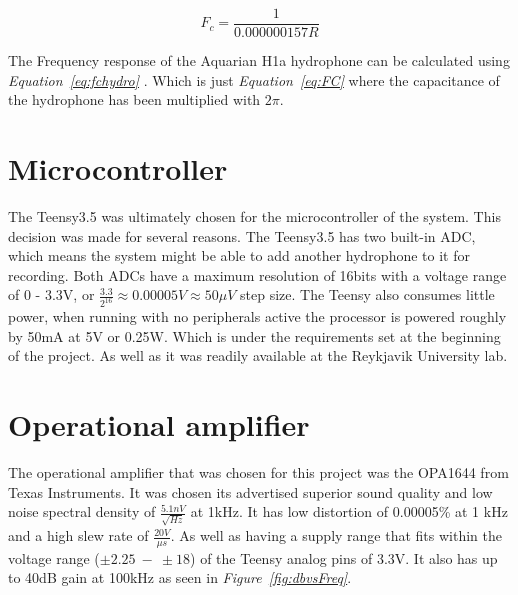 \clearpage

\begin{equation}
    F_c = \frac{1}{ 0.000000157 R}  
\label{eq:fchydro}
\end{equation}

The Frequency response of the Aquarian H1a hydrophone can be calculated using \textit{Equation~\ref{eq:fchydro}} \cite{noauthor_aquarian_nodate}. 
Which is just \textit{Equation~\ref{eq:FC}} where the capacitance of the hydrophone has been multiplied with $2\pi$.



\section{Microcontroller}
The Teensy3.5 was ultimately chosen for the microcontroller of the system.
This decision was made for several reasons.
The Teensy3.5 has two built-in ADC, which means the system might be able to add another hydrophone to it for recording.
Both ADCs have a maximum resolution of 16bits with a voltage range of 0 - 3.3V, or $\frac{3.3}{2^{16}} \approx 0.00005V \approx 50\mu V$ step size.
The Teensy also consumes little power, when running with no peripherals active the processor is powered roughly by 50mA at 5V or 0.25W.
Which is under the requirements set at the beginning of the project.
As well as it was readily available at the Reykjavik University lab.

\section{Operational amplifier}

The operational amplifier that was chosen for this project was the OPA1644 from Texas Instruments.
It was chosen its advertised superior sound quality and low noise spectral density of $\frac{5.1nV}{\sqrt{Hz}}$ at 1kHz.
It has low distortion of 0.00005\% at 1 kHz and a high slew rate of $\frac{20V}{\mu s}$.
As well as having a supply range that fits within the voltage range ($\pm2.25~-~\pm18$) of the Teensy analog pins of 3.3V\cite{noauthor_opa164x_nodate}.
It also has up to 40dB gain at 100kHz as seen in \textit{Figure~\ref{fig:dbvsFreq}}.

